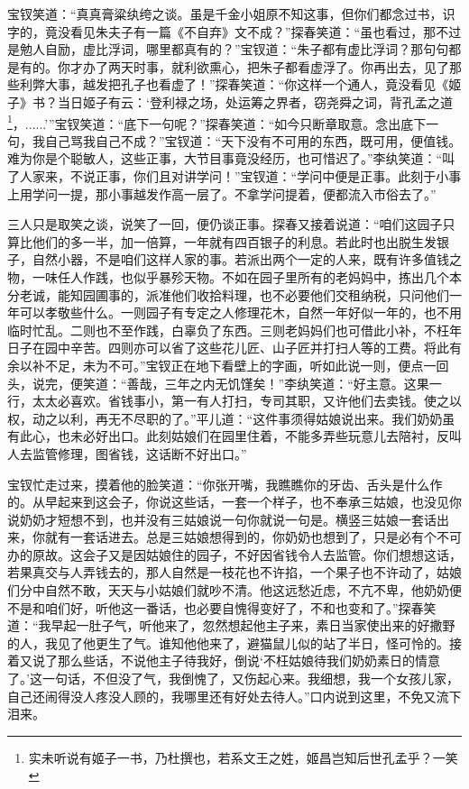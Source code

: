 \documentclass[12pt,oneside]{book}
\begin{document}
宝钗笑道：“真真膏粱纨绔之谈。虽是千金小姐原不知这事，但你们都念过书，识字的，竟没看见朱夫子有一篇《不自弃》文不成？”探春笑道：“虽也看过，那不过是勉人自励，虚比浮词，哪里都真有的？”宝钗道：“朱子都有虚比浮词？那句句都是有的。你才办了两天时事，就利欲熏心，把朱子都看虚浮了。你再出去，见了那些利弊大事，越发把孔子也看虚了！”探春笑道：“你这样一个通人，竟没看见《姬子》书？当日姬子有云：‘登利禄之场，处运筹之界者，窃尧舜之词，背孔孟之道\footnote{实未听说有姬子一书，乃杜撰也，若系文王之姓，姬昌岂知后世孔孟乎？一笑}，......’”宝钗笑道：“底下一句呢？”探春笑道：“如今只断章取意。念出底下一句，我自己骂我自己不成？”宝钗道：“天下没有不可用的东西，既可用，便值钱。难为你是个聪敏人，这些正事，大节目事竟没经历，也可惜迟了。”李纨笑道：“叫了人家来，不说正事，你们且对讲学问！”宝钗道：“学问中便是正事。此刻于小事上用学问一提，那小事越发作高一层了。不拿学问提着，便都流入市俗去了。”

三人只是取笑之谈，说笑了一回，便仍谈正事。探春又接着说道：“咱们这园子只算比他们的多一半，加一倍算，一年就有四百银子的利息。若此时也出脱生发银子，自然小器，不是咱们这样人家的事。若派出两个一定的人来，既有许多值钱之物，一味任人作践，也似乎暴殄天物。不如在园子里所有的老妈妈中，拣出几个本分老诚，能知园圃事的，派准他们收拾料理，也不必要他们交租纳税，只问他们一年可以孝敬些什么。一则园子有专定之人修理花木，自然一年好似一年的，也不用临时忙乱。二则也不至作践，白辜负了东西。三则老妈妈们也可借此小补，不枉年日子在园中辛苦。四则亦可以省了这些花儿匠、山子匠并打扫人等的工费。将此有余以补不足，未为不可。”宝钗正在地下看壁上的字画，听如此说一则，便点一回头，说完，便笑道：“善哉，三年之内无饥馑矣！”李纨笑道：“好主意。这果一行，太太必喜欢。省钱事小，第一有人打扫，专司其职，又许他们去卖钱。使之以权，动之以利，再无不尽职的了。”平儿道：“这件事须得姑娘说出来。我们奶奶虽有此心，也未必好出口。此刻姑娘们在园里住着，不能多弄些玩意儿去陪衬，反叫人去监管修理，图省钱，这话断不好出口。”

宝钗忙走过来，摸着他的脸笑道：“你张开嘴，我瞧瞧你的牙齿、舌头是什么作的。从早起来到这会子，你说这些话，一套一个样子，也不奉承三姑娘，也没见你说奶奶才短想不到，也并没有三姑娘说一句你就说一句是。横竖三姑娘一套话出来，你就有一套话进去。总是三姑娘想得到的，你奶奶也想到了，只是必有个不可办的原故。这会子又是因姑娘住的园子，不好因省钱令人去监管。你们想想这话，若果真交与人弄钱去的，那人自然是一枝花也不许掐，一个果子也不许动了，姑娘们分中自然不敢，天天与小姑娘们就吵不清。他这远愁近虑，不亢不卑，他奶奶便不是和咱们好，听他这一番话，也必要自愧得变好了，不和也变和了。”探春笑道：“我早起一肚子气，听他来了，忽然想起他主子来，素日当家使出来的好撒野的人，我见了他更生了气。谁知他他来了，避猫鼠儿似的站了半日，怪可怜的。接着又说了那么些话，不说他主子待我好，倒说‘不枉姑娘待我们奶奶素日的情意了。’这一句话，不但没了气，我倒愧了，又伤起心来。我细想，我一个女孩儿家，自己还闹得没人疼没人顾的，我哪里还有好处去待人。”口内说到这里，不免又流下泪来。
\end{document}

